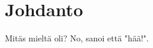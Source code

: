 \chapter{Johdanto\label{intro}}

Mitäs mieltä \citet{einstein} oli? No, \citep{einstein} sanoi että "hää!".
